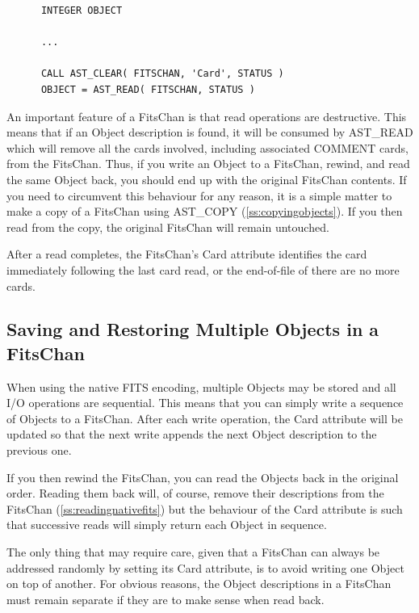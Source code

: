 \documentclass[twoside,11pt]{article}
\newcommand{\htmlref}[2]{#1}
\newcommand{\secref}[1]{\S\ref{#1}}
\renewcommand{\secref}[1]{\ref{#1}}
\begin{document}
\small
\begin{verbatim}
      INTEGER OBJECT

      ...

      CALL AST_CLEAR( FITSCHAN, 'Card', STATUS )
      OBJECT = AST_READ( FITSCHAN, STATUS )
\end{verbatim}
\normalsize

An important feature of a FitsChan is that read operations are
destructive. This means that if an Object description is found, it
will be consumed by AST\_READ which will remove all the cards
involved, including associated COMMENT cards, from the FitsChan. Thus,
if you write an Object to a FitsChan, rewind, and read the same Object
back, you should end up with the original FitsChan contents.  If you
need to circumvent this behaviour for any reason, it is a simple
matter to make a copy of a FitsChan using \htmlref{AST\_COPY}{AST_COPY}
(\secref{ss:copyingobjects}). If you then read from the copy, the
original FitsChan will remain untouched.

After a read completes, the FitsChan's \htmlref{Card}{Card} attribute identifies the
card immediately following the last card read, or the end-of-file of
there are no more cards.

\subsection{Saving and Restoring Multiple Objects in a FitsChan}

When using the native FITS encoding, multiple Objects may be stored
and all I/O operations are sequential.  This means that you can simply
write a sequence of Objects to a \htmlref{FitsChan}{FitsChan}. After each write operation,
the \htmlref{Card}{Card} attribute will be updated so that the next write appends the
next \htmlref{Object}{Object} description to the previous one.

If you then rewind the FitsChan, you can read the Objects back in the
original order. Reading them back will, of course, remove their
descriptions from the FitsChan (\secref{ss:readingnativefits}) but the
behaviour of the Card attribute is such that successive reads will
simply return each Object in sequence.

The only thing that may require care, given that a FitsChan can always
be addressed randomly by setting its Card attribute, is to avoid
writing one Object on top of another. For obvious reasons, the Object
descriptions in a FitsChan must remain separate if they are to make
sense when read back.
\end{document}
